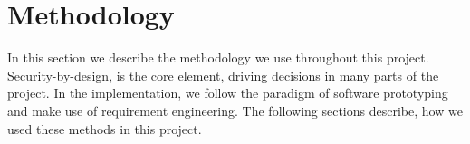 \section{Methodology}\label{sec:methodology}
% 
In this section we describe the methodology we use throughout this project. Security-by-design, is the core element, driving decisions in many parts of the project. In the implementation, we follow the paradigm of software prototyping and make use of requirement engineering. The following sections describe, how we used these methods in this project.
% 

% 

% 

